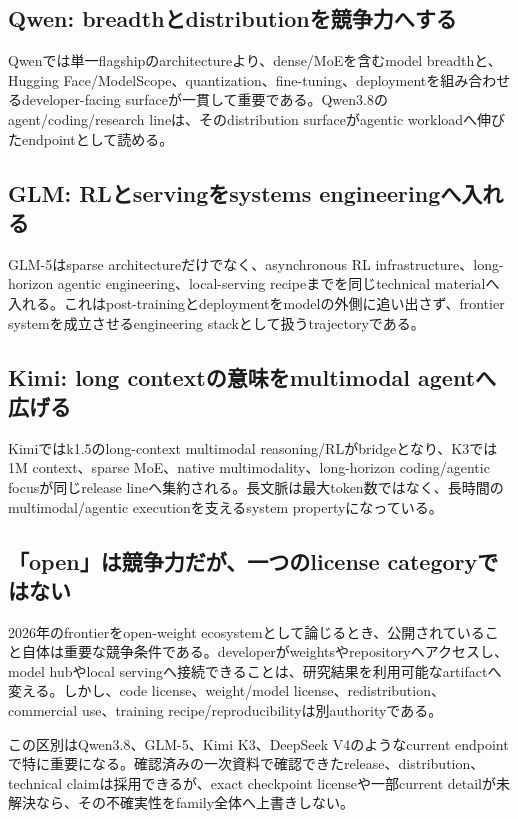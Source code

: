 \documentclass[lualatex,a4paper,10pt]{jlreq}
\begin{document}
\subsection{Qwen: breadthとdistributionを競争力へする}
Qwenでは単一flagshipのarchitectureより、dense/MoEを含むmodel breadthと、Hugging Face/ModelScope、quantization、fine-tuning、deploymentを組み合わせるdeveloper-facing surfaceが一貫して重要である。Qwen3.8のagent/coding/research lineは、そのdistribution surfaceがagentic workloadへ伸びたendpointとして読める。\autocite{qwen2,qwen38}

\subsection{GLM: RLとservingをsystems engineeringへ入れる}
GLM-5はsparse architectureだけでなく、asynchronous RL infrastructure、long-horizon agentic engineering、local-serving recipeまでを同じtechnical materialへ入れる。これはpost-trainingとdeploymentをmodelの外側に追い出さず、frontier systemを成立させるengineering stackとして扱うtrajectoryである。\autocite{glm5}

\subsection{Kimi: long contextの意味をmultimodal agentへ広げる}
Kimiではk1.5のlong-context multimodal reasoning/RLがbridgeとなり、K3では1M context、sparse MoE、native multimodality、long-horizon coding/agentic focusが同じrelease lineへ集約される。長文脈は最大token数ではなく、長時間のmultimodal/agentic executionを支えるsystem propertyになっている。\autocite{kimik15,kimik3}

\subsection{「open」は競争力だが、一つのlicense categoryではない}
2026年のfrontierをopen-weight ecosystemとして論じるとき、公開されていること自体は重要な競争条件である。developerがweightsやrepositoryへアクセスし、model hubやlocal servingへ接続できることは、研究結果を利用可能なartifactへ変える。しかし、code license、weight/model license、redistribution、commercial use、training recipe/reproducibilityは別authorityである。

この区別はQwen3.8、GLM-5、Kimi K3、DeepSeek V4のようなcurrent endpointで特に重要になる。確認済みの一次資料で確認できたrelease、distribution、technical claimは採用できるが、exact checkpoint licenseや一部current detailが未解決なら、その不確実性をfamily全体へ上書きしない。\autocite{deepseekv4,qwen38,glm5,kimik3}
\end{document}

